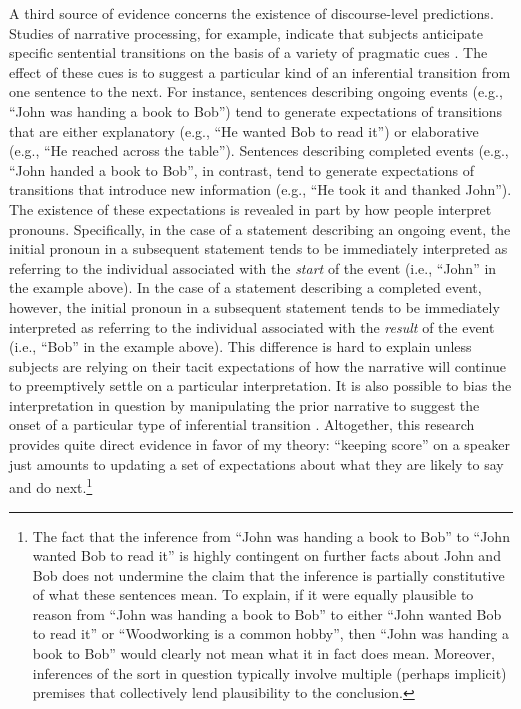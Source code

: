 A third source of evidence concerns the existence of discourse-level predictions. Studies of narrative processing, for example, indicate that subjects anticipate specific sentential transitions on the basis of a variety of pragmatic cues \citep{Rohde:2008}. The effect of these cues is to suggest a particular kind of an inferential transition from one sentence to the next. For instance, sentences describing ongoing events (e.g., ``John was handing a book to Bob'') tend to generate expectations of transitions that are either explanatory (e.g., ``He wanted Bob to read it'') or elaborative (e.g., ``He reached across the table''). Sentences describing completed events (e.g., ``John handed a book to Bob'', in contrast, tend to generate expectations of transitions that introduce new information (e.g., ``He took it and thanked John''). The existence of these expectations is revealed in part by how people interpret pronouns. Specifically, in the case of a statement describing an ongoing event, the initial pronoun in a subsequent statement tends to be immediately interpreted as referring to the individual associated with the \textit{start} of the event (i.e., ``John'' in the example above). In the case of a statement describing a completed event, however, the initial pronoun in a subsequent statement tends to be immediately interpreted as referring to the individual associated with the \textit{result} of the event (i.e., ``Bob'' in the example above). This difference is hard to explain unless subjects are relying on their tacit expectations of how the narrative will continue to preemptively settle on a particular interpretation. It is also possible to bias the interpretation in question by manipulating the prior narrative to suggest the onset of a particular type of inferential transition \citep{Rohde:2008}. Altogether, this research provides quite direct evidence in favor of my theory: ``keeping score'' on a speaker just amounts to updating a set of expectations about what they are likely to say and do next.\footnote{The fact that the inference from ``John was handing a book to Bob'' to ``John wanted Bob to read it'' is highly contingent on further facts about John and Bob does not undermine the claim that the inference is partially constitutive of what these sentences mean. To explain, if it were equally plausible to reason from ``John was handing a book to Bob'' to either ``John wanted Bob to read it'' or ``Woodworking is a common hobby'', then ``John was handing a book to Bob'' would clearly not mean what it in fact does mean. Moreover, inferences of the sort in question typically involve multiple (perhaps implicit) premises that collectively lend plausibility to the conclusion.}

